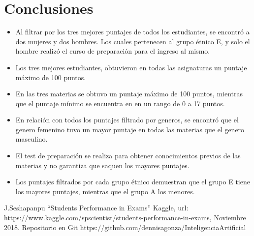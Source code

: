 \documentclass[conference,compsoc,onecolumn]{IEEEtran}
\begin{document}
        \section{Conclusiones}\label{conclusiones}
        \begin{itemize}
        \item Al filtrar por los tres mejores puntajes de todos los estudiantes, se encontró a dos mujeres y dos hombres. Los cuales pertenecen al grupo étnico E, y solo el hombre realizó el curso de preparación para el ingreso al mismo.
        \item Los tres mejores estudiantes, obtuvieron en todas las asignaturas un puntaje máximo de 100 puntos.
        \item En las tres materias se obtuvo un puntaje máximo de 100 puntos, mientras que el puntaje mínimo se encuentra en en un rango de 0 a 17 puntos.
        \item En relación con todos los puntajes filtrado por generos, se encontró que el genero femenino tuvo un mayor puntaje en todas las materias que el genero masculino.
        \item El test de preparación se realiza para obtener conocimientos previos de las materias y no garantiza que saquen los mayores puntajes.
        \item Los puntajes filtrados por cada grupo étnico demuestran que el grupo E tiene los mayores puntajes, mientras que el grupo A los menores.
        \end{itemize} 
        
    \begin{thebibliography}{00}
     J.Seshapanpu ``Students Performance in Exams'' Kaggle, url: https://www.kaggle.com/spscientist/students-performance-in-exams, Noviembre 2018.
     Repositorio en Git https://github.com/dennisagonza/InteligenciaArtificial
    \end{thebibliography}
\end{document}
